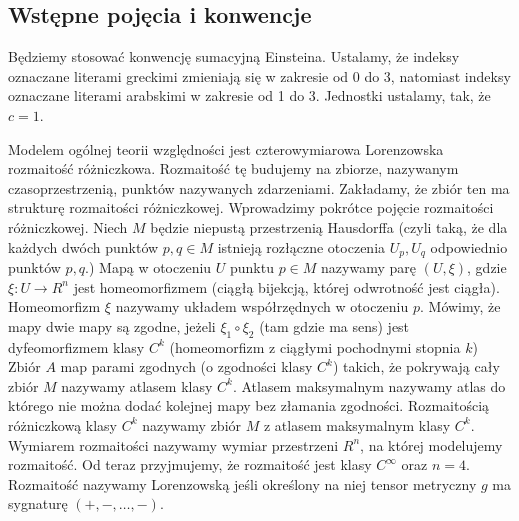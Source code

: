 \subsection{Wstępne pojęcia i konwencje}
Będziemy stosować konwencję sumacyjną Einsteina. Ustalamy, że 
indeksy oznaczane literami greckimi zmieniają się w zakresie od 0 do 3, 
natomiast indeksy oznaczane literami arabskimi 
w zakresie od 1 do 3. Jednostki ustalamy, tak, że $c=1$.


Modelem ogólnej teorii względności jest czterowymiarowa Lorenzowska 
rozmaitość różniczkowa. Rozmaitość tę budujemy na 
zbiorze, nazywanym czasoprzestrzenią, punktów nazywanych zdarzeniami. 
Zakładamy, że zbiór ten ma strukturę rozmaitości różniczkowej.
Wprowadzimy pokrótce pojęcie rozmaitości różniczkowej.
Niech $M$ będzie niepustą przestrzenią Hausdorffa (czyli taką, że
dla każdych dwóch punktów $p,q\in M$ 
istnieją rozłączne otoczenia $U_p,U_q$ odpowiednio punktów $p,q$.) 
Mapą w otoczeniu $U$ punktu $p\in M$ nazywamy parę $(U,\xi )$, gdzie  
$\xi : U \to R^n$ jest homeomorfizmem (ciągłą bijekcją, której 
odwrotność jest ciągła). 
Homeomorfizm $\xi$ nazywamy układem współrzędnych 
w otoczeniu $p$.
Mówimy, że mapy dwie mapy są zgodne, jeżeli $\xi_1 \circ \xi_2$ (tam 
gdzie ma sens)
jest dyfeomorfizmem klasy $C^k$ (homeomorfizm z 
ciągłymi pochodnymi stopnia $k$)
Zbiór $A$ map parami zgodnych (o zgodności klasy $C^k$) 
takich, że pokrywają cały zbiór $M$ nazywamy 
atlasem klasy $C^k$. Atlasem maksymalnym nazywamy atlas do którego
nie można dodać kolejnej mapy bez złamania zgodności.
Rozmaitością różniczkową klasy $C^k$ nazywamy 
zbiór $M$ z atlasem maksymalnym klasy $C^k$.
Wymiarem rozmaitości nazywamy wymiar przestrzeni $R^n$, na której 
modelujemy rozmaitość. Od teraz przyjmujemy, że rozmaitość 
jest klasy $C^\infty$ oraz $n=4$.
Rozmaitość nazywamy Lorenzowską jeśli określony na niej tensor
metryczny $g$ ma sygnaturę $(+,-,\dots ,-)$.


